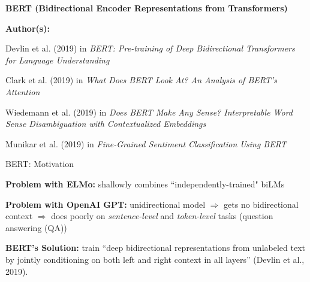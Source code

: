 \begin{frame}{}
    \begin{center}
        \large \textbf{BERT (Bidirectional Encoder Representations from Transformers)}
    \end{center}
    \vspace{20pt}
    
    \textbf{Author(s):}
    \begin{itemizeSpaced}{5pt}
    {\color{DimGrey} 
    
        \item Devlin et al. (2019) in \emph{BERT: Pre-training of Deep Bidirectional Transformers for Language Understanding}
        
        \item Clark et al. (2019) in \emph{What Does BERT Look At? An Analysis of BERT's Attention}
        
        \item Wiedemann et al. (2019) in \emph{Does BERT Make Any Sense? Interpretable Word Sense Disambiguation with Contextualized Embeddings}
        
        \item Munikar et al. (2019) in \emph{Fine-Grained Sentiment Classification Using BERT}
        
    }
    \end{itemizeSpaced}
\end{frame}





\begin{frame}{BERT: Motivation} 
    
    \begin{itemizeSpaced}{7pt}
        \footnotesize 
        
        \pinkbox \textbf{Problem with ELMo: } shallowly combines ``independently-trained" biLMs
        
        \item \textbf{Problem with OpenAI GPT: }unidirectional model $\Rightarrow$ gets no bidirectional context $\Rightarrow$ does poorly on \emph{sentence-level} and \emph{token-level} tasks (question answering (QA))

        
        \pinkbox \textbf{BERT's Solution: } train ``deep bidirectional representations from unlabeled text by jointly conditioning on both left and right context in all layers” (Devlin et al., 2019).
    \end{itemizeSpaced}
    
\end{frame}


